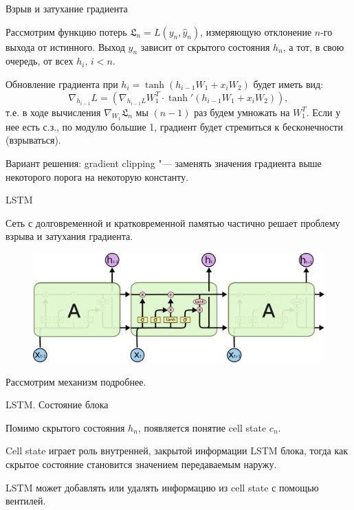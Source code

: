 \documentclass[notheorems, handout, 10pt]{beamer}
\begin{document}
	\begin{frame}{Взрыв и затухание градиента}
		
		Рассмотрим функцию потерь $\mathfrak{L}_n=L(y_n, \hat{y}_n)$, измеряющую отклонение $n$-го выхода от истинного. Выход $y_n$ зависит от скрытого состояния $h_n$, а тот, в свою очередь, от всех $h_i$, $i < n$.
		
		\vspace{0.5cm}
		
		Обновление градиента при $h_i=\tanh(h_{i-1}W_1 + x_iW_2)$ будет иметь вид: $$\nabla_{h_{i-1}}L=(\nabla_{h_{i-1}L}W_1^T \cdot \tanh'(h_{i-1}W_1 + x_iW_2)),$$ т.е. в ходе вычисления $\nabla_{W_1}\mathfrak{L}_n$ мы $(n-1)$ раз будем умножать на $W_1^T$. Если у нее есть с.з., по модулю большие 1, градиент будет стремиться к бесконечности (взрываться).
		
		\vspace{0.5cm}
		
		Вариант решения: gradient clipping "--- заменять значения градиента выше некоторого порога на некоторую константу.
		
		\note{}
		
	\end{frame}
	
	\begin{frame}{LSTM}
		
		Сеть с долговременной и кратковременной памятью частично решает проблему взрыва и затухания градиента.
		
		\begin{figure}[H]
			\includegraphics[width=1\linewidth]{images/6}
		\end{figure}
		
		Рассмотрим механизм подробнее.
		
		\note{}
		
	\end{frame}
	
	\begin{frame}{LSTM. Состояние блока}
		
		Помимо скрытого состояния $h_n$, появляется понятие cell state $c_n$.
		
		\vspace{0.5cm}
		
		Cell state играет роль внутренней, закрытой информации LSTM блока, тогда как скрытое состояние становится значением передаваемым наружу.
		
		\vspace{0.5cm}
		
		LSTM может добавлять или удалять информацию из cell state с помощью вентилей.
	
		\note{}
		
	\end{frame}
	
\end{document}
